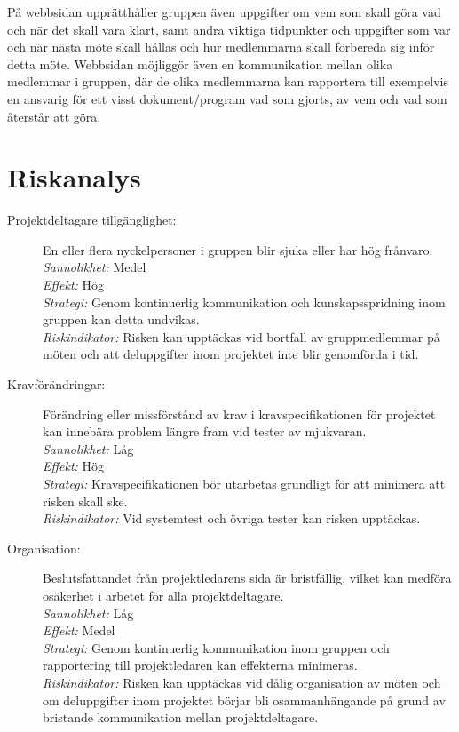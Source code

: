 \documentclass[a4paper]{article}
\begin{document}
På webbsidan upprätthåller gruppen även uppgifter om vem som skall göra vad och när det skall vara klart, samt andra viktiga 
tidpunkter och uppgifter som var och när nästa möte skall hållas och hur medlemmarna skall förbereda sig inför detta möte. Webbsidan möjliggör även en
kommunikation mellan olika medlemmar i gruppen, där de olika medlemmarna kan rapportera till exempelvis en ansvarig för ett visst
dokument/program vad som gjorts, av vem och vad som återstår att göra.


\section{Riskanalys}

\begin{description}
\item[Projektdeltagare tillgänglighet:]
En eller flera nyckelpersoner i gruppen blir sjuka eller har hög frånvaro. \\
\emph{Sannolikhet:}
Medel \\
\emph{Effekt:}
Hög \\
\emph{Strategi:}
Genom kontinuerlig kommunikation och kunskapsspridning inom gruppen kan detta
undvikas. \\
\emph{Riskindikator:}
Risken kan upptäckas vid bortfall av gruppmedlemmar på möten och att 
deluppgifter inom projektet inte blir genomförda i tid.

\item[Kravförändringar:]
Förändring eller missförstånd av krav i kravspecifikationen för projektet kan
 innebära problem längre fram vid tester av mjukvaran. \\
\emph{Sannolikhet:}
Låg \\
\emph{Effekt:}
Hög \\
\emph{Strategi:}
Kravspecifikationen bör utarbetas grundligt för att minimera att risken skall
 ske. \\
\emph{Riskindikator:}
Vid systemtest och övriga tester kan risken upptäckas.

\item[Organisation:]
Beslutsfattandet från projektledarens sida är bristfällig, vilket kan medföra
 osäkerhet i arbetet för alla projektdeltagare. \\
\emph{Sannolikhet:}
Låg \\
\emph{Effekt:}
Medel \\
\emph{Strategi:}
Genom kontinuerlig kommunikation inom gruppen och rapportering till
 projektledaren kan effekterna minimeras. \\
\emph{Riskindikator:}
Risken kan upptäckas vid dålig organisation av möten och om deluppgifter inom
 projektet börjar bli osammanhängande på grund av bristande kommunikation
 mellan projektdeltagare.


\end{description}
\end{document}
